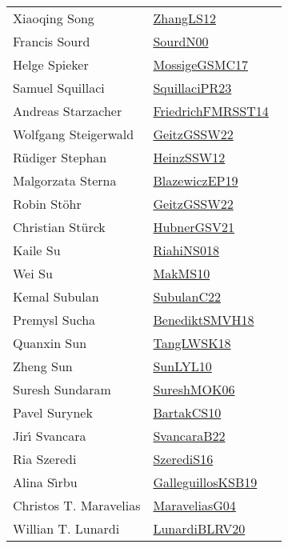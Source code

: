 {\begin{longtable}{p{4cm}p{20cm}}
Xiaoqing Song & \href{papers/ZhangLS12.pdf}{ZhangLS12}~\cite{ZhangLS12}\\
Francis Sourd & \href{}{SourdN00}~\cite{SourdN00}\\
Helge Spieker & \href{papers/MossigeGSMC17.pdf}{MossigeGSMC17}~\cite{MossigeGSMC17}\\
Samuel Squillaci & \href{papers/SquillaciPR23.pdf}{SquillaciPR23}~\cite{SquillaciPR23}\\
Andreas Starzacher & \href{}{FriedrichFMRSST14}~\cite{FriedrichFMRSST14}\\
Wolfgang Steigerwald & \href{papers/GeitzGSSW22.pdf}{GeitzGSSW22}~\cite{GeitzGSSW22}\\
R{\"{u}}diger Stephan & \href{articles/HeinzSSW12.pdf}{HeinzSSW12}~\cite{HeinzSSW12}\\
Malgorzata Sterna & \href{}{BlazewiczEP19}~\cite{BlazewiczEP19}\\
Robin St{\"{o}}hr & \href{papers/GeitzGSSW22.pdf}{GeitzGSSW22}~\cite{GeitzGSSW22}\\
Christian St{\"{u}}rck & \href{articles/HubnerGSV21.pdf}{HubnerGSV21}~\cite{HubnerGSV21}\\
Kaile Su & \href{papers/RiahiNS018.pdf}{RiahiNS018}~\cite{RiahiNS018}\\
Wei Su & \href{papers/MakMS10.pdf}{MakMS10}~\cite{MakMS10}\\
Kemal Subulan & \href{articles/SubulanC22.pdf}{SubulanC22}~\cite{SubulanC22}\\
Premysl Sucha & \href{papers/BenediktSMVH18.pdf}{BenediktSMVH18}~\cite{BenediktSMVH18}\\
Quanxin Sun & \href{}{TangLWSK18}~\cite{TangLWSK18}\\
Zheng Sun & \href{papers/SunLYL10.pdf}{SunLYL10}~\cite{SunLYL10}\\
Suresh Sundaram & \href{}{SureshMOK06}~\cite{SureshMOK06}\\
Pavel Surynek & \href{articles/BartakCS10.pdf}{BartakCS10}~\cite{BartakCS10}\\
Jir{\'{\i}} Svancara & \href{}{SvancaraB22}~\cite{SvancaraB22}\\
Ria Szeredi & \href{papers/SzerediS16.pdf}{SzerediS16}~\cite{SzerediS16}\\
Alina S{\^{\i}}rbu & \href{papers/GalleguillosKSB19.pdf}{GalleguillosKSB19}~\cite{GalleguillosKSB19}\\
Christos T. Maravelias & \href{papers/MaraveliasG04.pdf}{MaraveliasG04}~\cite{MaraveliasG04}\\
Willian T. Lunardi & \href{articles/LunardiBLRV20.pdf}{LunardiBLRV20}~\cite{LunardiBLRV20}\\

\end{longtable}}
